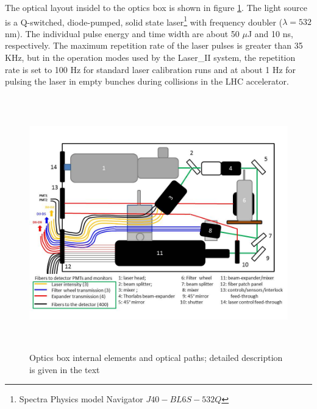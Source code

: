 The optical layout insidel to the optics box is shown in figure \ref{fig:x.2}. The
light source is a Q-switched, diode-pumped, solid state 
laser\footnote{Spectra Physics model Navigator $J40-BL6S-532Q$} with frequency
doubler ($\lambda = 532$ nm). The individual pulse energy 
and time width are about 50 $\mu$J and 10 ns, respectively. The maximum repetition
rate of the laser pulses is greater than 35 KHz, but in the operation modes 
used by the Laser\_II system, the repetition rate is set to 100 Hz for standard
laser calibration runs and at about 1 Hz for pulsing the laser 
in empty bunches during collisions in the LHC accelerator. 
% 
\begin{figure}[htb]
\begin{center} 
\includegraphics[width=16cm, height=11cm]{figures/Layout}
\caption{Optics box internal elements and optical paths; detailed description is
given in the text
}\label{fig:x.2}
\end{center}
\end{figure}
%

